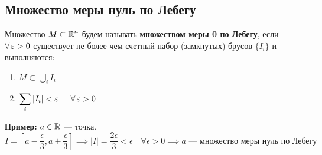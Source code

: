 \subsection{Множество меры нуль по Лебегу}

 Множество $M\subset\operatorname{\mathbb{R}}^n$ будем называть \textbf{множеством меры 0 по Лебегу}, если $\forall\operatorname{\varepsilon}>0$ существует не более чем счетный набор (замкнутых) брусов $\{I_i\}$ и выполняются:
\begin{enumerate}[label=\textbullet]
    \item $M\subset \displaystyle\bigcup_iI_i$
    \item $\displaystyle\sum_i|I_i| < \ve\,\, \quad \forall \ve > 0$
\end{enumerate}

\textbf{Пример:} $a \in \operatorname{\mathbb{R}}$  --- точка.
\begin{equation}
    I = [a - \frac{\epsilon}{3}, a + \frac{\epsilon}{3}] \implies |I| = \frac{2 \epsilon}{3} < \epsilon \quad \forall \epsilon > 0 \implies a \text{ --- множество меры нуль по Лебегу}
\end{equation}




